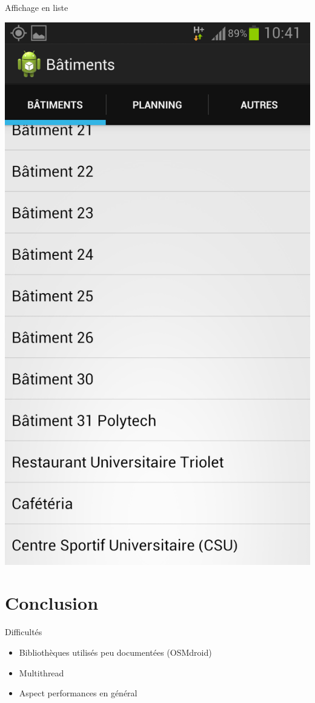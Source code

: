 \documentclass{beamer}
\begin{document}
		\begin{frame}
			Affichage en liste
			\begin{center}
				\includegraphics[scale=0.15]{../rapport/liste.png}
			\end{center}
		\end{frame}
	\section{Conclusion}
		\begin{frame}{Difficultés}
			\begin{itemize}
				\item Bibliothèques utilisés peu documentées (OSMdroid)
				\item Multithread
				\item Aspect performances en général
			\end{itemize}
		\end{frame}
		
\end{document}
